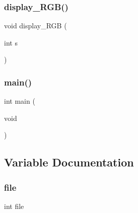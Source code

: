 \subsubsection{\texorpdfstring{display\+\_\+\+R\+G\+B()}{display\_RGB()}}
{\footnotesize\ttfamily void display\+\_\+\+R\+GB (\begin{DoxyParamCaption}\item[{int}]{s }\end{DoxyParamCaption})}

\mbox{\label{sesor_8c_09_09_a840291bc02cba5474a4cb46a9b9566fe}} 
\subsubsection{\texorpdfstring{main()}{main()}}
{\footnotesize\ttfamily int main (\begin{DoxyParamCaption}\item[{void}]{ }\end{DoxyParamCaption})}



\subsection{Variable Documentation}
\mbox{\label{sesor_8c_09_09_a6fb021f1c9bd6c7fc72f1c0f24b81b38}} 
\subsubsection{\texorpdfstring{file}{file}}
{\footnotesize\ttfamily int file}

